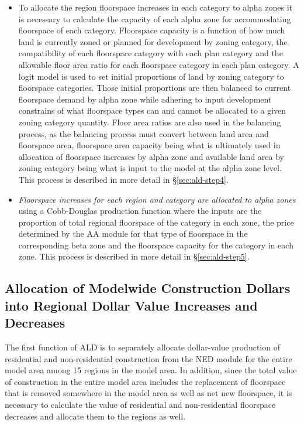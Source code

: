 \begin{itemize}
\item To allocate the region floorspace increases in each category to alpha zones it is necessary to calculate the capacity of each alpha zone for accommodating floorspace of each category. Floorspace capacity is a function of how much land is currently zoned or planned for development by zoning category, the compatibility of each floorspace category with each plan category and the allowable floor area ratio for each floorspace category in each plan category. A logit model is used to set initial proportions of land by zoning category to floorspace categories. Those initial proportions are then balanced to current floorspace demand by alpha zone while adhering to input development constrains of what floorspace types can and cannot be allocated to a given zoning category quantity. Floor area ratios are also used in the balancing process, as the balancing process must convert between land area and floorspace area, floorspace area capacity being what is ultimately used in allocation of floorspace increases by alpha zone and available land area by zoning category being what is input to the model at the alpha zone level. This process is described in more detail in \S\ref{sec:ald-step4}.
\item \textit{Floorspace increases for each region and category are allocated to alpha zones} using a Cobb-Douglas production function where the inputs are the proportion of total regional floorspace of the category in each zone, the price determined by the AA module for that type of floorspace in the corresponding beta zone and the floorspace capacity for the category in each zone. This process is described in more detail in \S\ref{sec:ald-step5}.
\end{itemize}

\subsection{Allocation of Modelwide Construction Dollars into Regional Dollar Value Increases and Decreases}\label{sec:ald-step1}  %
The first function of ALD is to separately allocate dollar-value production of residential and non-residential construction from the NED module for the entire model area among 15 regions in the model area. In addition, since the total value of construction in the entire model area includes the replacement of floorspace that is removed somewhere in the model area as well as net new floorspace, it is necessary to calculate the value of residential and non-residential floorspace decreases and allocate them to the regions as well. 

